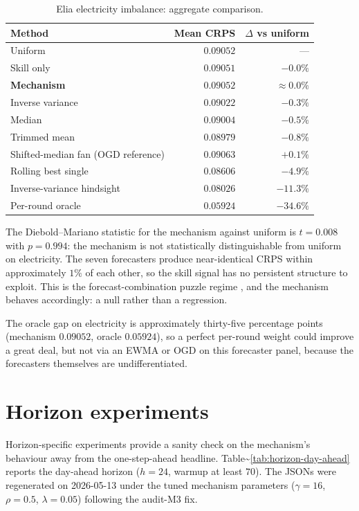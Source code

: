 \documentclass[
  11pt,
  a4paper,
  oneside]{report}
\begin{document}
\begin{table}[h]
\centering
\small
\begin{tabular}{lrr}
\toprule
Method & Mean CRPS & $\Delta$ vs uniform \\
\midrule
Uniform & $0.09052$ & --- \\
Skill only & $0.09051$ & $-0.0\%$ \\
\textbf{Mechanism} & $\mathbf{0.09052}$ & $\mathbf{\approx 0.0\%}$ \\
Inverse variance & $0.09022$ & $-0.3\%$ \\
Median & $0.09004$ & $-0.5\%$ \\
Trimmed mean & $0.08979$ & $-0.8\%$ \\
Shifted-median fan (OGD reference) & $0.09063$ & $+0.1\%$ \\
Rolling best single & $0.08606$ & $-4.9\%$ \\
Inverse-variance hindsight & $0.08026$ & $-11.3\%$ \\
Per-round oracle & $0.05924$ & $-34.6\%$ \\
\bottomrule
\end{tabular}
\caption{Elia electricity imbalance: aggregate comparison.}
\label{tab:electricity-null}
\end{table}

The Diebold--Mariano statistic for the mechanism against uniform is
\(t = 0.008\) with \(p = 0.994\): the mechanism is not statistically
distinguishable from uniform on electricity. The seven forecasters
produce near-identical CRPS within approximately \(1\%\) of each other,
so the skill signal has no persistent structure to exploit. This is the
forecast-combination puzzle regime
\citep{bates1969combination, timmermann2006forecast}, and the mechanism
behaves accordingly: a null rather than a regression.

The oracle gap on electricity is approximately thirty-five percentage
points (mechanism \(0.09052\), oracle \(0.05924\)), so a perfect
per-round weight could improve a great deal, but not via an EWMA or OGD
on this forecaster panel, because the forecasters themselves are
undifferentiated.

\section{Horizon experiments}\label{horizon-experiments}

Horizon-specific experiments provide a sanity check on the mechanism's
behaviour away from the one-step-ahead headline.
Table\textasciitilde{}\ref{tab:horizon-day-ahead} reports the day-ahead
horizon (\(h = 24\), warmup at least \(70\)). The JSONs were
regenerated on 2026-05-13 under the tuned mechanism parameters
(\(\gamma = 16\), \(\rho = 0.5\), \(\lambda = 0.05\)) following the
audit-M3 fix.
\end{document}
